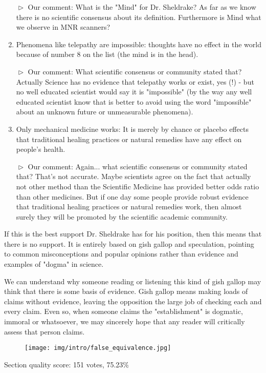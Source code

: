 \begin{enumerate}
		$\vartriangleright$ Our comment: What is the "Mind" for Dr. Sheldrake? As far as we know there is no scientific consensus about its definition. Furthermore is Mind what we observe in MNR scanners?

		\item \og Phenomena like telepathy are impossible: thoughts have no effect in the world because of number 8 on the list (the mind is in the head). \fg{}
		
		$\vartriangleright$ Our comment: What scientific consensus or community stated that? Actually Science has no evidence that telepathy works or exist, yes (!) - but no well educated scientist would say it is "impossible" (by the way any well educated scientist know that is better to avoid using the word "impossible" about an unknown future or unmeasurable phenomena).

		\item \og Only mechanical medicine works: It is merely by chance or placebo effects that traditional healing practices or natural remedies have any effect on people's health. \fg{}
		
		$\vartriangleright$ Our comment: Again... what scientific consensus or community stated that? That's not accurate. Maybe scientists agree on the fact that actually not other method than the Scientific Medicine has provided better odds ratio than other medicines. But if one day some people provide robust evidence that traditional healing practices or natural remedies work, then almost surely they will be promoted by the scientific academic community.
	\end{enumerate}
	
	If this is the best support Dr. Sheldrake has for his position, then this means that there is no support. It is entirely based on gish gallop and speculation, pointing to common misconceptions and popular opinions rather than evidence and examples of "dogma" in science.
	
	We can understand why someone reading or listening this kind of gish gallop may think that there is some basis of evidence. Gish gallop means making loads of claims without evidence, leaving the opposition the large job of checking each and every claim. Even so, when someone claims the "establishment" is dogmatic, immoral or whatsoever, we may sincerely hope that any reader will critically assess that person claims.
	
	\begin{figure}[H]
		\centering
		\texttt{[image: img/intro/false\_equivalence.jpg]}
	\end{figure}
	
	\begin{flushright}
	Section quality score:  151 votes, 75.23\%
	\end{flushright}